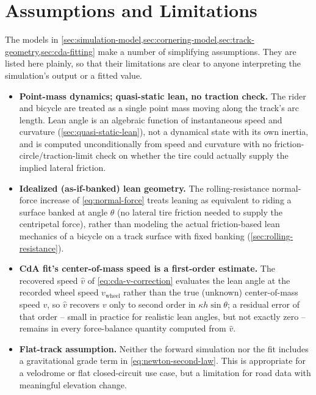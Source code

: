 \section{Assumptions and Limitations}
\label{sec:assumptions}

The models in \cref{sec:simulation-model,sec:cornering-model,sec:track-geometry,sec:cda-fitting}
make a number of simplifying assumptions. They are listed here plainly, so that
their limitations are clear to anyone interpreting the simulation's output or a
fitted \CdA{} value.

\begin{itemize}
    \item \textbf{Point-mass dynamics; quasi-static lean, no traction check.}
    The rider and bicycle are treated as a single point mass moving along the
    track's arc length. Lean angle is an algebraic function of instantaneous
    speed and curvature (\cref{sec:quasi-static-lean}), not a dynamical state
    with its own inertia, and is computed unconditionally from speed and
    curvature with no friction-circle/traction-limit check on whether the tire
    could actually supply the implied lateral friction.

    \item \textbf{Idealized (as-if-banked) lean geometry.} The
    rolling-resistance normal-force increase of \cref{eq:normal-force} treats
    leaning as equivalent to riding a surface banked at angle $\theta$ (no
    lateral tire friction needed to supply the centripetal force), rather than
    modeling the actual friction-based lean mechanics of a bicycle on a track
    surface with fixed banking (\cref{sec:rolling-resistance}).

    \item \textbf{CdA fit's center-of-mass speed is a first-order estimate.}
    The recovered speed $\hat v$ of \cref{eq:cda-v-correction} evaluates the
    lean angle at the recorded wheel speed $v_{\mathrm{wheel}}$ rather than
    the true (unknown) center-of-mass speed $v$, so $\hat v$ recovers $v$ only
    to second order in $\kappa h \sin\theta$; a residual error of that order
    -- small in practice for realistic lean angles, but not exactly zero --
    remains in every force-balance quantity computed from $\hat v$.

    \item \textbf{Flat-track assumption.} Neither the forward simulation nor the
    \CdA{} fit includes a gravitational grade term in \cref{eq:newton-second-law}.
    This is appropriate for a velodrome or flat closed-circuit use case, but a
    limitation for road data with meaningful elevation change.


\end{itemize}
